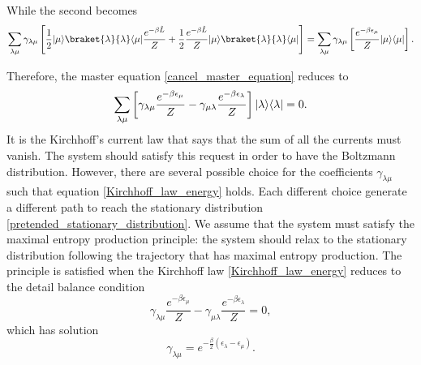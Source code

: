 While the second becomes
\begin{equation}
    \sum_{\lambda\mu} \gamma_{\lambda\mu}\left[\frac{1}{2}\ket{\mu}\braket{\lambda}{\lambda}\bra{\mu}\frac{e^{-\beta\hat L}}{Z} +\frac{1}{2}\frac{e^{-\beta\hat L}}{Z}\ket{\mu}\braket{\lambda}{\lambda}\bra{\mu}\right]= \sum_{\lambda\mu} \gamma_{\lambda\mu}\left[\frac{e^{-\beta \epsilon_\mu}}{Z}\ket{\mu}\bra{\mu}\right].
\end{equation}

Therefore, the master equation \eqref{cancel_master_equation} reduces to 
\begin{equation}\label{Kirchhoff_law_energy}
    \sum_{\lambda\mu}\left[\gamma_{\lambda\mu}\frac{e^{-\beta \epsilon_\mu}}{Z} - \gamma_{\mu\lambda}\frac{e^{-\beta \epsilon_\lambda}}{Z}\right]\lvert\lambda\rangle\langle\lambda\rvert = 0.
\end{equation}
It is the Kirchhoff's current law that says that the sum of all the currents must vanish. The system should satisfy this request in order to have the Boltzmann distribution.
However, there are several possible choice for the coefficients $\gamma_{\lambda\mu}$ such that equation \eqref{Kirchhoff_law_energy} holds.
Each different choice generate a different path to reach the stationary distribution \eqref{pretended_stationary_distribution}. We assume that the system must satisfy the maximal entropy production principle: the system should relax to the stationary distribution following the trajectory that has maximal entropy production. The principle is satisfied when the Kirchhoff law \eqref{Kirchhoff_law_energy} reduces to the detail balance condition
\begin{equation}
    \gamma_{\lambda\mu}\frac{e^{-\beta \epsilon_\mu}}{Z} - \gamma_{\mu\lambda}\frac{e^{-\beta \epsilon_\lambda}}{Z} = 0,
\end{equation}
which has solution
\begin{equation}\label{gamma_detailed_balance}
    \gamma_{\lambda\mu} = e^{-\frac{\beta}{2}\left(\epsilon_\lambda - \epsilon_\mu\right)}.
\end{equation}

